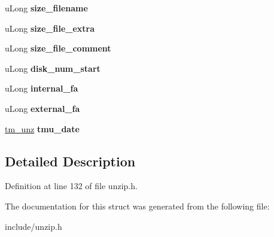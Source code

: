\begin{DoxyCompactItemize}
\item 
\hypertarget{structunz__file__info__s_ae4f2f81a5301f7df9014838a56a496c6}{u\-Long {\bfseries size\-\_\-filename}}\label{structunz__file__info__s_ae4f2f81a5301f7df9014838a56a496c6}

\item 
\hypertarget{structunz__file__info__s_a479402dcb3555c922e3ce87c8f967990}{u\-Long {\bfseries size\-\_\-file\-\_\-extra}}\label{structunz__file__info__s_a479402dcb3555c922e3ce87c8f967990}

\item 
\hypertarget{structunz__file__info__s_afa9feffb3b9c9c03e02599118d5f548e}{u\-Long {\bfseries size\-\_\-file\-\_\-comment}}\label{structunz__file__info__s_afa9feffb3b9c9c03e02599118d5f548e}

\item 
\hypertarget{structunz__file__info__s_ab7bfba2b7d0cdb7260a7cd9f9ccd00ff}{u\-Long {\bfseries disk\-\_\-num\-\_\-start}}\label{structunz__file__info__s_ab7bfba2b7d0cdb7260a7cd9f9ccd00ff}

\item 
\hypertarget{structunz__file__info__s_aa20738bf82bca71cc950b9475b5d8c3c}{u\-Long {\bfseries internal\-\_\-fa}}\label{structunz__file__info__s_aa20738bf82bca71cc950b9475b5d8c3c}

\item 
\hypertarget{structunz__file__info__s_ae3365fdb260668fca60bfb975b1513aa}{u\-Long {\bfseries external\-\_\-fa}}\label{structunz__file__info__s_ae3365fdb260668fca60bfb975b1513aa}

\item 
\hypertarget{structunz__file__info__s_ad52c08c65349f674b00244d81cdb1736}{\hyperlink{structtm__unz__s}{tm\-\_\-unz} {\bfseries tmu\-\_\-date}}\label{structunz__file__info__s_ad52c08c65349f674b00244d81cdb1736}

\end{DoxyCompactItemize}


\subsection{Detailed Description}


Definition at line 132 of file unzip.\-h.



The documentation for this struct was generated from the following file\-:\begin{DoxyCompactItemize}
\item 
include/unzip.\-h\end{DoxyCompactItemize}
